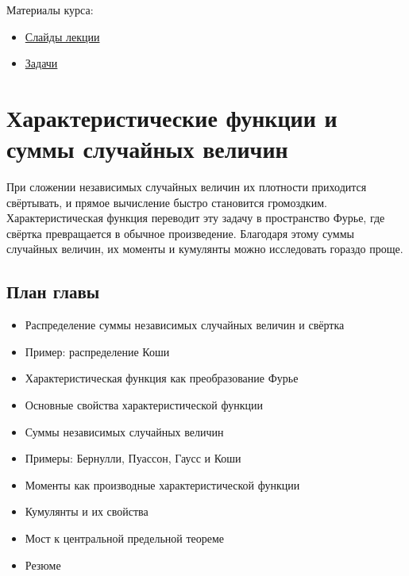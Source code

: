 \documentclass[
  russian,
  12pt,
  a4paper,
  a4paper,
  openany]{scrbook}
\providecommand{\tightlist}{%
  \setlength{\itemsep}{0pt}\setlength{\parskip}{0pt}}
\begin{document}
Материалы курса:

\begin{itemize}
\tightlist
\item
  \href{https://neutrinohit.github.io/statistical-analysis-course/ru/slides/01_random_distributions.html}{Слайды
  лекции}
\item
  \href{https://neutrinohit.github.io/statistical-analysis-course/ru/slides/exercises/01_random_distributions_exercises.html}{Задачи}
\end{itemize}

\chapter{Характеристические функции и суммы случайных
величин}\label{ux445ux430ux440ux430ux43aux442ux435ux440ux438ux441ux442ux438ux447ux435ux441ux43aux438ux435-ux444ux443ux43dux43aux446ux438ux438-ux438-ux441ux443ux43cux43cux44b-ux441ux43bux443ux447ux430ux439ux43dux44bux445-ux432ux435ux43bux438ux447ux438ux43d}

\begin{bookchapteropening}

При сложении независимых случайных величин их плотности приходится
свёртывать, и прямое вычисление быстро становится громоздким.
Характеристическая функция переводит эту задачу в пространство Фурье,
где свёртка превращается в обычное произведение. Благодаря этому суммы
случайных величин, их моменты и кумулянты можно исследовать гораздо
проще.

\end{bookchapteropening}

\section{План
главы}\label{ux43fux43bux430ux43d-ux433ux43bux430ux432ux44b-1}

\begin{itemize}
\tightlist
\item
  Распределение суммы независимых случайных величин и свёртка
\item
  Пример: распределение Коши
\item
  Характеристическая функция как преобразование Фурье
\item
  Основные свойства характеристической функции
\item
  Суммы независимых случайных величин
\item
  Примеры: Бернулли, Пуассон, Гаусс и Коши
\item
  Моменты как производные характеристической функции
\item
  Кумулянты и их свойства
\item
  Мост к центральной предельной теореме
\item
  Резюме
\end{itemize}
\end{document}
